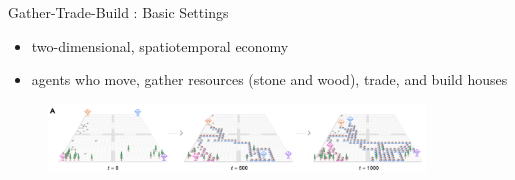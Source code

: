 \documentclass{beamer}
\begin{document}
    \begin{frame}{Gather-Trade-Build : Basic Settings}
        \begin{itemize}
            \item two-dimensional, spatiotemporal economy
            \item agents who move, gather resources (stone and wood), trade, and build houses
        \end{itemize}
        \begin{figure}[h]
            \includegraphics[width=10cm]{./img/pic3.png}
        \end{figure}
        
    \end{frame}
    
\end{document}
